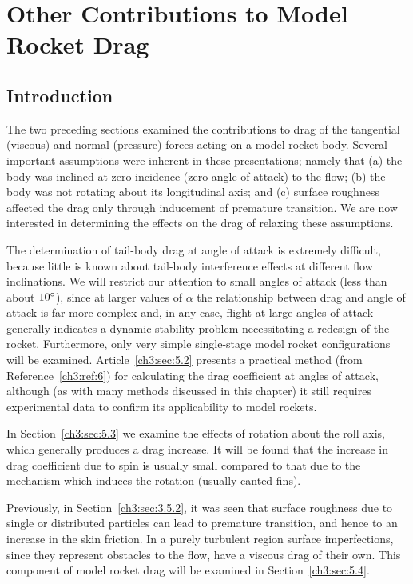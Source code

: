 \section{Other Contributions to Model Rocket Drag}\label{ch3:sec:5}

\subsection{Introduction}\label{ch3:sec:5.1}

The two preceding sections examined the contributions to drag of the tangential
(viscous) and normal (pressure) forces acting on a model rocket body. Several
important assumptions were inherent in these presentations; namely that (a) the
body was inclined at zero incidence (zero angle of attack) to the flow; (b) the
body was not rotating about its longitudinal axis; and (c) surface roughness
affected the drag only through inducement of premature transition. We are now
interested in determining the effects on the drag of relaxing these
assumptions.

The determination of tail-body drag at angle of attack is extremely difficult,
because little is known about tail-body interference effects at different flow
inclinations. We will restrict our attention to small angles of attack (less
than about $10^{\circ}$), since at larger values of $\alpha$ the relationship between
drag and angle of attack is far more complex and, in any case, flight at large
angles of attack generally indicates a dynamic stability problem necessitating
a redesign of the rocket. Furthermore, only very simple single-stage model
rocket configurations will be examined. Article~\ref{ch3:sec:5.2} presents a
practical method (from Reference~\ref{ch3:ref:6}) for calculating the drag
coefficient at angles of attack, although (as with many methods discussed in
this chapter) it still requires experimental data to confirm its applicability
to model rockets.

In Section~\ref{ch3:sec:5.3} we examine the effects of rotation about the roll
axis, which generally produces a drag increase. It will be found that the
increase in drag coefficient due to spin is usually small compared to that due
to the mechanism which induces the rotation (usually canted fins).

Previously, in Section~\ref{ch3:sec:3.5.2}, it was seen that surface roughness
due to single or distributed particles can lead to premature transition, and
hence to an increase in the skin friction. In a purely turbulent region surface
imperfections, since they represent obstacles to the flow, have a viscous drag
of their own. This component of model rocket drag will be examined in
Section~\ref{ch3:sec:5.4}.

